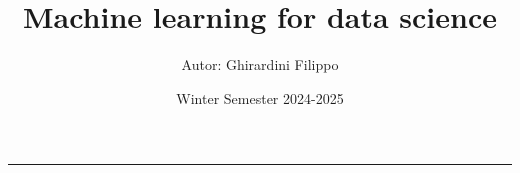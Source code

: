 \documentclass[a4paper,10pt]{article}
\title{\textbf{Machine learning for data science}}
\author{Autor: Ghirardini Filippo}
\date{Winter Semester 2024-2025}
\theoremstyle{remark}
\theoremstyle{definition}
\theoremstyle{plain}
\theoremstyle{definition}
\theoremstyle{definition}
\theoremstyle{definition}
\theoremstyle{plain}
\theoremstyle{plain}
\begin{document}


\tableofcontents
\newpage
\maketitle
\begin{center}
    \vspace{-20pt}
    \rule{11cm}{.1pt} 
\end{center}
\newpage









\end{document}

